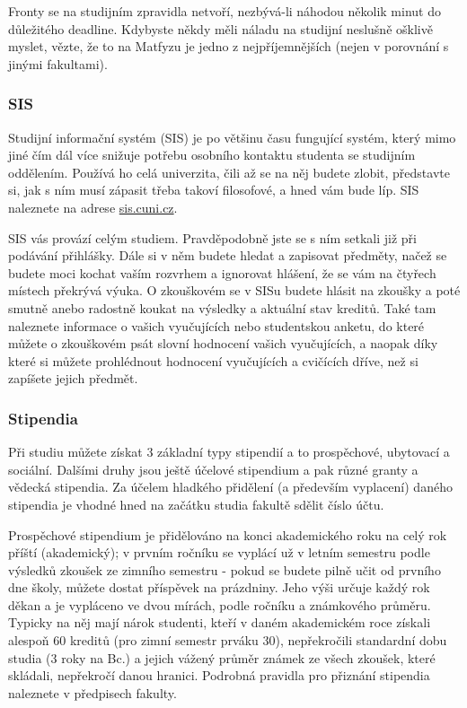 Fronty se na studijním zpravidla netvoří, nezbývá-li náhodou několik minut do důležitého deadline. Kdybyste někdy měli
náladu na studijní neslušně ošklivě myslet, vězte, že to na Matfyzu je jedno z nejpříjemnějších (nejen v porovnání s
jinými fakultami).


\subsubsection{SIS}
Studijní informační systém (SIS) je po většinu času fungující systém, který mimo jiné čím dál více snižuje potřebu
osobního kontaktu studenta se studijním oddělením. Používá ho celá univerzita, čili až se na něj budete zlobit,
představte si, jak s ním musí zápasit třeba takoví filosofové, a hned vám bude líp. SIS naleznete na adrese
\url{sis.cuni.cz}.

SIS vás provází celým studiem. Pravděpodobně jste se s ním setkali již při podávání přihlášky. Dále si v něm budete
hledat a zapisovat předměty, načež se budete moci kochat vaším rozvrhem a ignorovat hlášení, že se vám na čtyřech
místech překrývá výuka. O zkouškovém se v SISu budete hlásit na zkoušky a poté smutně anebo radostně koukat na výsledky
a aktuální stav kreditů. Také tam naleznete informace o vašich vyučujících nebo studentskou anketu, do které můžete o
zkouškovém psát slovní hodnocení vašich vyučujících, a naopak díky které si můžete prohlédnout hodnocení vyučujících a
cvičících dříve, než si zapíšete jejich předmět.

\subsubsection{Stipendia}
Při studiu můžete získat 3 základní typy stipendií a to prospěchové, ubytovací a sociální. Dalšími druhy jsou ještě
účelové stipendium a pak různé granty a vědecká stipendia. Za účelem hladkého přidělení (a především vyplacení) daného
stipendia je vhodné hned na začátku studia fakultě sdělit číslo účtu.

Prospěchové stipendium je přidělováno na konci akademického roku na celý rok příští (akademický); v prvním ročníku se
vyplácí už v letním semestru podle výsledků zkoušek ze zimního semestru - pokud se budete pilně učit od prvního dne
školy, můžete dostat příspěvek na prázdniny. Jeho výši určuje každý rok děkan a je vypláceno ve dvou mírách, podle
ročníku a známkového průměru. Typicky na něj mají nárok studenti, kteří v daném akademickém roce získali alespoň 60
kreditů (pro zimní semestr prváku 30), nepřekročili standardní dobu studia (3 roky na Bc.) a jejich vážený průměr známek
ze všech zkoušek, které skládali, nepřekročí danou hranici. Podrobná pravidla pro přiznání stipendia naleznete v
předpisech fakulty.

